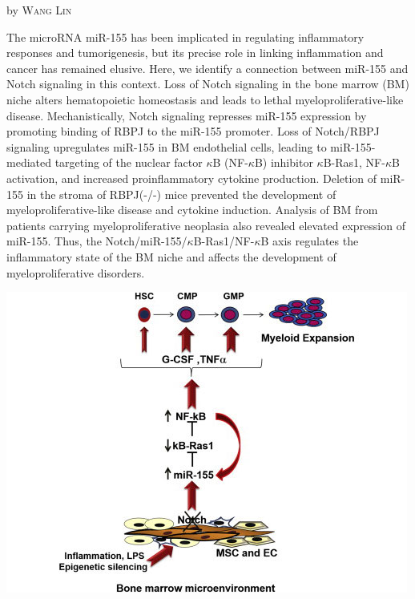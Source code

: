 \documentclass[10pt,a4paper]{article}
\newcommand{\NewsItem}[1]{ %
\usefont{T1}{fvs}{n}{n} %
\vspace{24pt}\large #1\vspace{3pt} %
\par \normalsize \normalfont}
\newcommand{\NewsAuthor}[1]{ %
\hfill by \textsc{#1} \vspace{20pt} %
\par \normalfont}
\begin{document}
\begin{multicols}{2}
\NewsItem{{\color{hugoteal}{Notch-Dependent Repression of miR-155 in the Bone Marrow Niche Regulates Hematopoiesis in an NF-$\kappa$B-Dependent Manner}}}
\NewsAuthor{Wang Lin}

The microRNA miR-155 has been implicated in regulating inflammatory responses and tumorigenesis, but its precise role in linking inflammation and cancer has remained elusive.
Here, we identify a connection between miR-155 and Notch signaling in this context.
Loss of Notch signaling in the bone marrow (BM) niche alters hematopoietic homeostasis and leads to lethal myeloproliferative-like disease.
Mechanistically, Notch signaling represses miR-155 expression by promoting binding of RBPJ to the miR-155 promoter.
Loss of Notch/RBPJ signaling upregulates miR-155 in BM endothelial cells, leading to miR-155-mediated targeting of the nuclear factor $\kappa$B (NF-$\kappa$B) inhibitor $\kappa$B-Ras1, NF-$\kappa$B activation, and increased proinflammatory cytokine production.
Deletion of miR-155 in the stroma of RBPJ(-/-) mice prevented the development of myeloproliferative-like disease and cytokine induction.
Analysis of BM from patients carrying myeloproliferative neoplasia also revealed elevated expression of miR-155.
Thus, the Notch/miR-155/$\kappa$B-Ras1/NF-$\kappa$B axis regulates the inflammatory state of the BM niche and affects the development of myeloproliferative disorders.\cite{wang2014notch}


\begin{center}
\includegraphics[width=0.8\linewidth]{microenvironment.png} %
\end{center}




\end{multicols}
\end{document}
